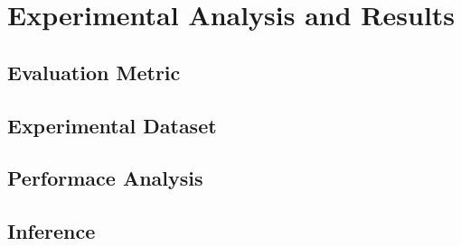 \chapter{Experimental Analysis and Results}

\section{Evaluation Metric}

\section{Experimental Dataset}

\section{Performace Analysis}

\section{Inference}
